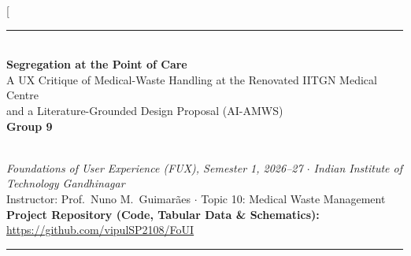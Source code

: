 \documentclass[10pt,twocolumn,a4paper]{article}
\begin{document}
\twocolumn[{%
\begin{center}
{\color{teal}\rule{\textwidth}{1.6pt}}\\[7pt]
{\sffamily\bfseries\fontsize{17}{20}\selectfont\color{navy} Segregation at the Point of Care}\\[3pt]
{\sffamily\fontsize{11.5}{14}\selectfont\color{navy} A UX Critique of Medical-Waste Handling at the Renovated IITGN Medical Centre\\ and a Literature-Grounded Design Proposal (AI-AMWS)}\\[7pt]
{\sffamily\small\textbf{Group 9}}

\\
{\small\itshape Foundations of User Experience (FUX), Semester 1, 2026--27 $\cdot$ Indian Institute of Technology Gandhinagar}\\
{\small Instructor: Prof.\ Nuno M.\ Guimar\~aes $\cdot$ Topic 10: Medical Waste Management}\\
{\small\sffamily\textbf{Project Repository (Code, Tabular Data \& Schematics):} \url{https://github.com/vipulSP2108/FoUI}}\\[5pt]
{\color{teal}\rule{\textwidth}{0.6pt}}
\end{center}
\vspace{-2pt}
\begin{center}
\begin{minipage}{0.94\textwidth}
\small{}%

\end{minipage}
\end{center}}
\end{document}
